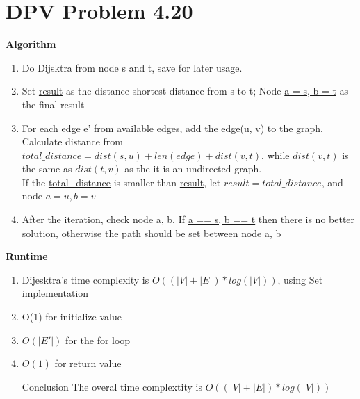 \documentclass{article}
\begin{document}
\section{DPV Problem 4.20}
\textbf{Algorithm}
\begin{enumerate}[Step 1]
    \item Do Dijsktra from node s and t, save for later usage.
    \item Set \underline{result} as the distance shortest distance from s to t; Node \underline{a = s, b = t} as the final result
    \item For each edge e' from available edges, add the edge(u, v) to the graph. Calculate distance from $total\_distance = dist(s, u) + len(edge) + dist(v, t)$, while $dist(v, t)$ is the same as $dist(t, v)$ as the it is an undirected graph. \\
    If the \underline{total\_distance} is smaller than \underline{result}, let $result = total\_distance$, and node $a = u, b = v$
    \item After the iteration, check node a, b. If \underline{a == s, b == t} then there is no better solution, otherwise the path should be set between node a, b
\end{enumerate}

\textbf{Runtime}
\begin{enumerate}[Step 1]
    \item Dijesktra's time complexity is $O((|V| + |E|) * log(|V|))$, using Set implementation
    \item O(1) for initialize value
    \item $O(|E'|)$ for the for loop
    \item $O(1)$ for return value
    \item [Conclusion] The overal time complextity is $O((|V| + |E|) * log(|V|))$
\end{enumerate}
\end{document}
